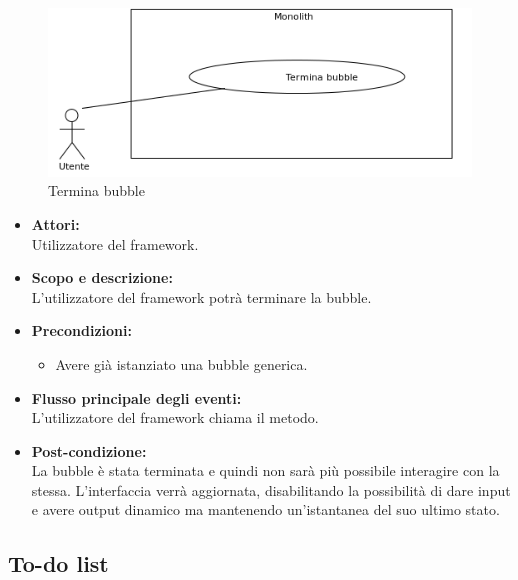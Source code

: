 
\begin{figure}[H]
	\centering
	\includegraphics[width=15cm]{../../documenti/AnalisiDeiRequisiti/Diagrammi_img/uc1_19.png}
	\caption{\UCCaption{} Termina bubble}
\end{figure}

\begin{itemize}
	\item \textbf{Attori:}
	\\Utilizzatore del framework.
	\item \textbf{Scopo e descrizione:} 
	\\L'utilizzatore del framework potrà terminare la bubble.
	\item \textbf{Precondizioni:}
	\begin{itemize}
		\item Avere già istanziato una bubble generica.
	\end{itemize}
	\item \textbf{Flusso principale degli eventi:}
	\\L'utilizzatore del framework chiama il metodo.
	\item \textbf{Post-condizione:}
	\\La bubble è stata terminata e quindi non sarà più possibile interagire con la stessa. L'interfaccia verrà aggiornata, disabilitando la possibilità di dare input e avere output dinamico ma mantenendo un'istantanea del suo ultimo stato.
\end{itemize}

\subsection{To-do list}


